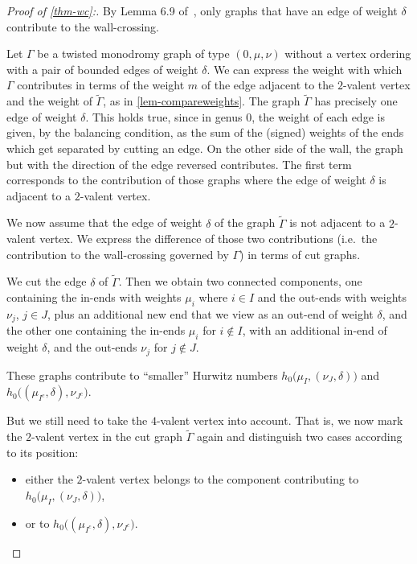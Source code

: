 \documentclass[10pt]{amsart}
\theoremstyle{plain}
\theoremstyle{definition}
\theoremstyle{definition}
\theoremstyle{plain}
\theoremstyle{plain}
\theoremstyle{remark}
\theoremstyle{plain}
\theoremstyle{plain}
\begin{document}
\begin{proof}[Proof of \cref{thm-wc}:]
By Lemma 6.9 of~\cite{CJM10}, only graphs that have an edge of weight $\delta$ contribute to the wall-crossing.

Let $\Gamma$ be a twisted monodromy graph of type $(0,\mu,\nu)$ without a vertex ordering with a pair of bounded edges of weight $\delta$.
We can express the weight with which $\Gamma$ contributes in terms of the weight $m$ of the edge adjacent to the $2$-valent vertex and the weight of $\tilde{\Gamma}$, as in \cref{lem-compareweights}.
The graph $\tilde{\Gamma}$ has precisely one edge of weight $\delta$. This holds true, since in genus $0$, the weight of each edge is given, by the balancing condition, as the sum of the (signed) weights of the ends which get separated by cutting an edge.  
On the other side of the wall, the graph but with the direction of the edge reversed contributes. The first term corresponds to the contribution of those graphs where the edge of weight $\delta$ is adjacent to a $2$-valent vertex. 

We now assume that the edge of weight $\delta$ of the graph $\tilde{\Gamma}$ is not adjacent to a $2$-valent vertex. We express the difference of those two contributions (i.e.\ the contribution to the wall-crossing governed by $\Gamma$) in terms of cut graphs.

We cut the edge $\delta$ of $\tilde{\Gamma}$.
Then we obtain two connected components, one containing the in-ends with weights $\mu_i$ where $i\in I$ and the out-ends with weights $\nu_j$, $j\in J$, plus an additional new end that we view as an out-end of weight $\delta$, and the other one containing the in-ends $\mu_i$ for $i \notin I$, with an additional in-end of weight $\delta$, and the out-ends $\nu_j$ for $j\notin J$.

These graphs contribute to ``smaller'' Hurwitz numbers $h_0\big(\mu_I,(\nu_J,\delta)\big)$ and $h_0\big((\mu_{I^c},\delta),\nu_{J^c}\big)$.

But we still need to take the $4$-valent vertex into account.
That is, we now mark the $2$-valent vertex in the cut graph $\tilde{\Gamma}$ again and
distinguish two cases according to its position:
\begin{itemize}
    \item either the $2$-valent vertex belongs to the component contributing to $h_0\big(\mu_I,(\nu_J,\delta)\big)$, 
    \item or to $h_0\big((\mu_{I^c},\delta),\nu_{J^c}\big)$.
\end{itemize}


\end{proof}
\end{document}
